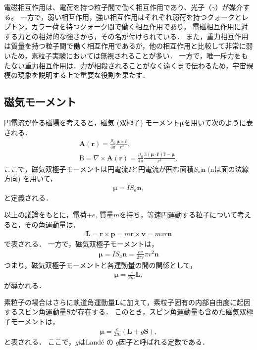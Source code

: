 \documentclass[uplatex,dvipdfmx,a4j,12pt]{jsarticle}
\begin{document}
電磁相互作用は、電荷を持つ粒子間で働く相互作用であり、光子（$\gamma$）が媒介する。
一方で，弱い相互作用，強い相互作用はそれぞれ弱荷を持つクォークとレプトン，カラー荷を持つクォーク間で働く相互作用であり，
電磁相互作用に対する力との相対的な強さから，その名が付けられている．
また，重力相互作用は質量を持つ粒子間で働く相互作用であるが，他の相互作用と比較して非常に弱いため，素粒子実験においては無視されることが多い．
一方で，唯一斥力をもたない重力相互作用は．力が相殺されることがなく遠くまで伝わるため，宇宙規模の現象を説明する上で重要な役割を果たす．

\subsection{磁気モーメント}
円電流が作る磁場を考えると，磁気 (双極子) モーメント$\boldsymbol{\mu}$を用いて次のように表される．
\begin{gather}
  \mathbf{A}(\mathbf{r}) = \frac{\mu_0}{4\pi}\frac{\boldsymbol{\mu}\times\hat{\mathbf{r}}}{r^2},\\
  \mathrm{B} = \nabla \times \mathbf{A}(\mathbf{r}) = \frac{\mu_0}{4\pi}\frac{3(\boldsymbol{\mu}\cdot\hat{\mathbf{r}})\hat{\mathbf{r}}-\boldsymbol{\mu}}{r^3},
\end{gather}
ここで，磁気双極子モーメントは円電流$I$と円電流が囲む面積$S_a \mathbf{n}$ ($\mathrm{n}$は面の法線方向) を用いて，
\begin{gather}
  \boldsymbol{\mu} = IS_a \mathbf{n},
\end{gather}
と定義される．

以上の議論をもとに，電荷$+e$, 質量$m$を持ち，等速円運動する粒子について考えると，その角運動量は，
\begin{gather}
  \mathbf{L} = \mathbf{r}\times\mathbf{p} = m \mathbf{r}\times\mathbf{v} = mvr \mathbf{n} 
\end{gather}
で表される．
一方で，磁気双極子モーメントは，
\begin{gather}
  \boldsymbol{\mu} = IS_a \mathbf{n} = \frac{ev}{2\pi r} \pi r^2 \mathbf{n}
\end{gather}
つまり，磁気双極子モーメントと各運動量の間の関係として，
\begin{gather}
  \boldsymbol{\mu} = \frac{e}{2m}\mathbf{L},
\end{gather}
が導かれる．

素粒子の場合はさらに軌道角運動量$\mathbf{L}$に加えて，素粒子固有の内部自由度に起因するスピン角運動量$\mathbf{S}$が存在する．
このとき，スピン角運動量も含めた磁気双極子モーメントは，
\begin{gather}
  \boldsymbol{\mu} = \frac{e}{2m}(\mathbf{L} + g\mathbf{S}),
\end{gather}
と表される．
ここで，$g$はLand\'e の $g$因子と呼ばれる定数である．
\end{document}
